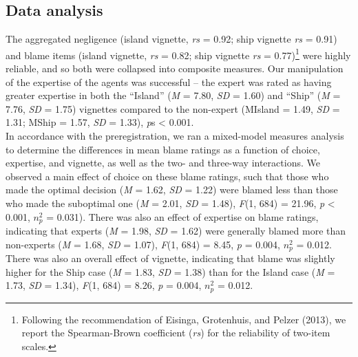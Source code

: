 \documentclass[
  man,floatsintext]{apa6}
\begin{document}
\hypertarget{data-analysis}{%
\subsection{Data analysis}\label{data-analysis}}

The aggregated negligence (island vignette, \emph{rs} = 0.92; ship vignette \emph{rs} = 0.91) and blame items (island vignette, \emph{rs} = 0.82; ship vignette \emph{rs} = 0.77)\footnote{Following the recommendation of Eisinga, Grotenhuis, and Pelzer (2013), we report the Spearman-Brown coefficient (\emph{rs}) for the reliability of two-item scales.} were highly reliable, and so both were collapsed into composite measures. Our manipulation of the expertise of the agents was successful -- the expert was rated as having greater expertise in both the ``Island'' (\emph{M} = 7.80, \emph{SD} = 1.60) and ``Ship'' (\emph{M} = 7.76, \emph{SD} = 1.75) vignettes compared to the non-expert (MIsland = 1.49, \emph{SD} = 1.31; MShip = 1.57, \emph{SD} = 1.33), \emph{p}s \textless{} 0.001.\\
In accordance with the preregistration, we ran a mixed-model measures analysis to determine the differences in mean blame ratings as a function of choice, expertise, and vignette, as well as the two- and three-way interactions. We observed a main effect of choice on these blame ratings, such that those who made the optimal decision (\emph{M} = 1.62, \emph{SD} = 1.22) were blamed less than those who made the suboptimal one (\emph{M} = 2.01, \emph{SD} = 1.48), \emph{F}(1, 684) = 21.96, \emph{p} \textless{} 0.001, \(n^2_p\) = 0.031). There was also an effect of expertise on blame ratings, indicating that experts (\emph{M} = 1.98, \emph{SD} = 1.62) were generally blamed more than non-experts (\emph{M} = 1.68, \emph{SD} = 1.07), \emph{F}(1, 684) = 8.45, \emph{p} = 0.004, \(n^2_p\) = 0.012. There was also an overall effect of vignette, indicating that blame was slightly higher for the Ship case (\emph{M} = 1.83, \emph{SD} = 1.38) than for the Island case (\emph{M} = 1.73, \emph{SD} = 1.34), \emph{F}(1, 684) = 8.26, \emph{p} = 0.004, \(n^2_p\) = 0.012.\\
\end{document}
